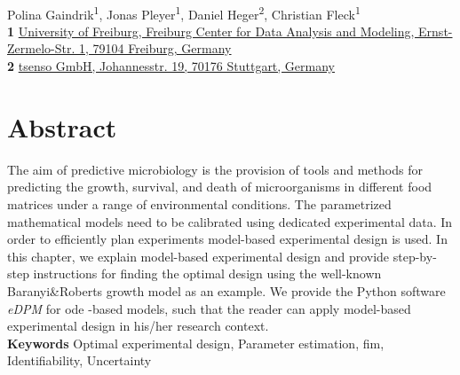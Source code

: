 \documentclass[10pt,A4paper]{article}
\providecommand{\keywords}[1]{\textbf{Keywords } #1}
\begin{document}
\vspace*{0.2in}
\begin{flushleft}
{\Large
\textbf{}}
\newline
\\
Polina Gaindrik\textsuperscript{1},
Jonas Pleyer\textsuperscript{1},
Daniel Heger\textsuperscript{2},
Christian Fleck\textsuperscript{1}
\\
\bigskip
\textbf{1} \href{https://www.fdm.uni-freiburg.de/spatsysbio}{University of Freiburg, Freiburg Center for Data Analysis and Modeling, Ernst-Zermelo-Str. 1, 79104 Freiburg, Germany}\\
\textbf{2} \href{https://tsenso.com/en/}{tsenso GmbH, Johannesstr. 19, 70176 Stuttgart, Germany}\\
\bigskip

\end{flushleft}
\section*{Abstract}
\linenumbers
The aim of predictive microbiology is the provision of tools and methods for predicting the growth, survival, and death of microorganisms in different food matrices under a range of environmental conditions. The parametrized mathematical models need to be calibrated using dedicated experimental data.
In order to efficiently plan experiments model-based experimental design is used. In this chapter, we explain model-based experimental design and provide step-by-step instructions for finding the optimal design using the well-known Baranyi\&Roberts growth model as an example. We provide the Python software {\it eDPM} for \ac{ode} -based models, such that the reader can apply model-based experimental design in his/her research context.\\
\keywords{Optimal experimental design, Parameter estimation, \ac{fim}, Identifiability, Uncertainty}
%
%
%
\end{document}

